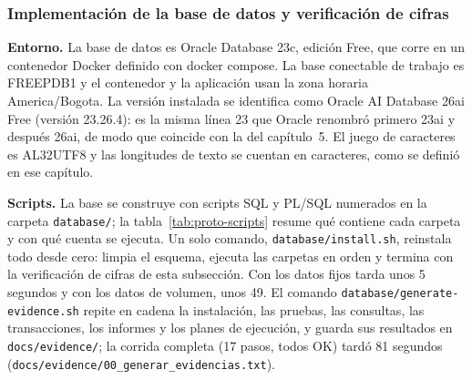 \subsubsection{Implementación de la base de datos y verificación de cifras}
\label{sec:proto-bd}

\textbf{Entorno.} La base de datos es Oracle Database 23c, edición Free,
que corre en un contenedor Docker definido con docker compose. La base
conectable de trabajo es FREEPDB1 y el contenedor y la aplicación usan
la zona horaria America/Bogota. La versión instalada se identifica como
Oracle AI Database 26ai Free (versión 23.26.4): es la misma línea 23 que
Oracle renombró primero 23ai y después 26ai, de modo que coincide con la
del capítulo~5. El juego de caracteres es AL32UTF8 y las longitudes de
texto se cuentan en caracteres, como se definió en ese capítulo.

\textbf{Scripts.} La base se construye con scripts SQL y PL/SQL
numerados en la carpeta \texttt{database/}; la tabla~\ref{tab:proto-scripts}
resume qué contiene cada carpeta y con qué cuenta se ejecuta. Un solo
comando, \texttt{database/install.sh}, reinstala todo desde cero: limpia el
esquema, ejecuta las carpetas en orden y termina con la verificación de
cifras de esta subsección. Con los datos fijos tarda unos 5 segundos y
con los datos de volumen, unos 49. El comando
\texttt{database/generate-evidence.sh} repite en cadena la instalación, las
pruebas, las consultas, las transacciones, los informes y los planes de
ejecución, y guarda sus resultados en \texttt{docs/evidence/}; la
corrida completa (17 pasos, todos OK) tardó 81 segundos
(\texttt{docs/evidence/00\_generar\_evidencias.txt}).

